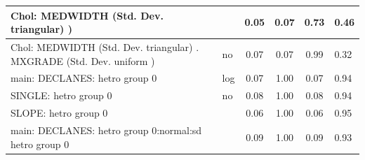 \begin{table}
\begin{center}
\begin{tabular}{|l|l|c|c|c|l|}
			\hline
			 Chol: MEDWIDTH (Std. Dev. triangular) ) &  & 0.05 & 0.07 & 0.73 & 0.46 \\
			\hline
			 Chol: MEDWIDTH (Std. Dev. triangular) . MXGRADE (Std. Dev.   uniform ) & no & 0.07 & 0.07 & 0.99 & 0.32 \\
			\hline
			main: DECLANES: hetro group 0 & log & 0.07 & 1.00 & 0.07 & 0.94 \\
			\hline
			SINGLE: hetro group 0 & no & 0.08 & 1.00 & 0.08 & 0.94 \\
			\hline
			SLOPE: hetro group 0 &  & 0.06 & 1.00 & 0.06 & 0.95 \\
			\hline
			main: DECLANES: hetro group 0:normal:sd  hetro group 0 &  & 0.09 & 1.00 & 0.09 & 0.93 \\
			\hline
		\end{tabular}
	\end{center}
\end{table}